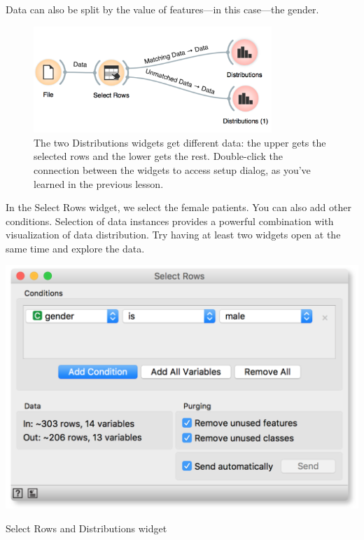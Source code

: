 \newpage
Data can also be split by the value of features—in this case—the gender.

\begin{figure}[h]
  \centering
  \includegraphics[width=90mm]{graphics/ch-basic_data_exploration/basic_data_exploration-fig3.png}%
  \caption{The two Distributions widgets get different data: the upper gets the selected rows and the lower gets the rest. Double-click the connection between the widgets to access setup dialog, as you've learned in the previous lesson.}
  \label{fig:basic_data_exploration-fig3}
\end{figure}

In the Select Rows widget, we select the female patients. You can also add other conditions. Selection of data instances provides a powerful combination with visualization of data distribution. Try having at least two widgets open at the same time and explore the data.

\begin{marginfigure}
  \includegraphics[width=\linewidth]{graphics/ch-basic_data_exploration/basic_data_exploration-fig4.png}%
  \caption{Select Rows and Distributions widget}
  \label{fig:basic_data_exploration-fig4}
\end{marginfigure}

